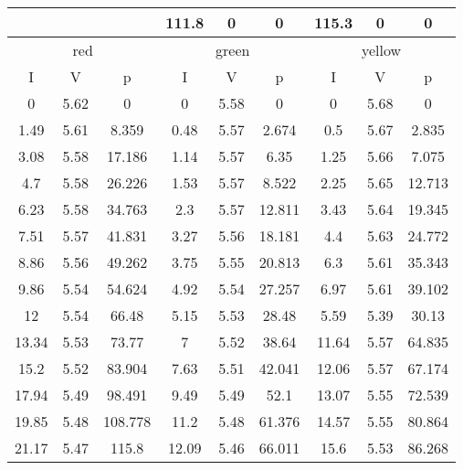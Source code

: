 \begin{table*}[]
\begin{tabular}{|c|c|c|c|c|c|c|c|c|}
\multicolumn{3}{|c|}{}                  & 111.8       & 0          & 0           & 115.3   & 0       & 0       \\ \hline
\multicolumn{3}{|c|}{red}               & \multicolumn{3}{c|}{green}             & \multicolumn{3}{c|}{yellow} \\ \hline
I            & V          & p           & I           & V          & p           & I       & V       & p       \\ \hline
0            & 5.62       & 0           & 0           & 5.58       & 0           & 0       & 5.68    & 0       \\ \hline
1.49         & 5.61       & 8.359       & 0.48        & 5.57       & 2.674       & 0.5     & 5.67    & 2.835   \\ \hline
3.08         & 5.58       & 17.186      & 1.14        & 5.57       & 6.35        & 1.25    & 5.66    & 7.075   \\ \hline
4.7          & 5.58       & 26.226      & 1.53        & 5.57       & 8.522       & 2.25    & 5.65    & 12.713  \\ \hline
6.23         & 5.58       & 34.763      & 2.3         & 5.57       & 12.811      & 3.43    & 5.64    & 19.345  \\ \hline
7.51         & 5.57       & 41.831      & 3.27        & 5.56       & 18.181      & 4.4     & 5.63    & 24.772  \\ \hline
8.86         & 5.56       & 49.262      & 3.75        & 5.55       & 20.813      & 6.3     & 5.61    & 35.343  \\ \hline
9.86         & 5.54       & 54.624      & 4.92        & 5.54       & 27.257      & 6.97    & 5.61    & 39.102  \\ \hline
12           & 5.54       & 66.48       & 5.15        & 5.53       & 28.48       & 5.59    & 5.39    & 30.13   \\ \hline
13.34        & 5.53       & 73.77       & 7           & 5.52       & 38.64       & 11.64   & 5.57    & 64.835  \\ \hline
15.2         & 5.52       & 83.904      & 7.63        & 5.51       & 42.041      & 12.06   & 5.57    & 67.174  \\ \hline
17.94        & 5.49       & 98.491      & 9.49        & 5.49       & 52.1        & 13.07   & 5.55    & 72.539  \\ \hline
19.85        & 5.48       & 108.778     & 11.2        & 5.48       & 61.376      & 14.57   & 5.55    & 80.864  \\ \hline
21.17        & 5.47       & 115.8       & 12.09       & 5.46       & 66.011      & 15.6    & 5.53    & 86.268  \\ \hline

\end{tabular}
\end{table*}

